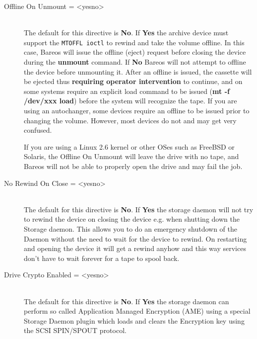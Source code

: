 \begin{description}
\item [Offline On Unmount = {\textless}yes{\textbar}no{\textgreater}] \hfill \\
The default for this directive is {\bf No}. If {\bf Yes} the  archive device
must support the {\tt MTOFFL ioctl} to rewind and  take the volume offline. In
this case, Bareos will issue the  offline (eject) request before closing the
device during the {\bf unmount}  command. If {\bf No} Bareos will not attempt
to offline the  device before unmounting it. After an offline is issued,  the
cassette will be ejected thus {\bf requiring operator intervention}  to
continue, and on some systems require an explicit load command  to be issued
({\bf mt -f /dev/xxx load}) before the system will recognize  the tape. If you
are using an autochanger, some devices  require an offline to be issued prior
to changing the volume. However,  most devices do not and may get very
confused.

If you are using a Linux 2.6 kernel or other OSes
such as FreeBSD or Solaris, the Offline On Unmount will leave the drive
with no tape, and Bareos will not be able to properly open the drive and
may fail the job.

\item [No Rewind On Close = {\textless}yes{\textbar}no{\textgreater}] \hfill \\
The default for this directive is {\bf No}. If {\bf Yes} the storage daemon
will not try to rewind the device on closing the device e.g. when shutting
down the Storage daemon. This allows you to do an emergency shutdown of
the Daemon without the need to wait for the device to rewind. On restarting
and opening the device it will get a rewind anyhow and this way services
don't have to wait forever for a tape to spool back.

\item [Drive Crypto Enabled = {\textless}yes{\textbar}no{\textgreater}] \hfill \\
The default for this directive is {\bf No}. If {\bf Yes} the storage daemon
can perform so called Application Managed Encryption (AME) using a special
Storage Daemon plugin which loads and clears the Encryption key using the
SCSI SPIN/SPOUT protocol.


\end{description}
